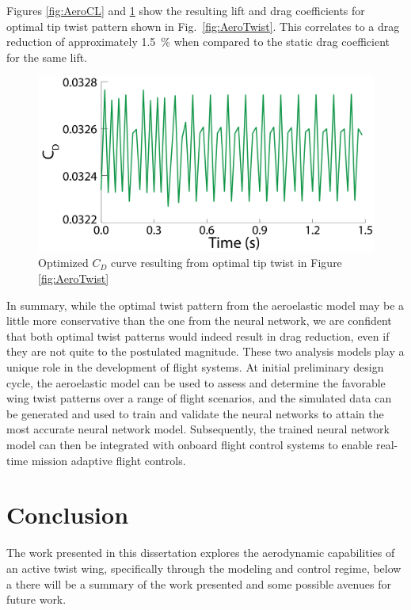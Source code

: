 \documentclass[11pt]{ucthesis}
\begin{document}
Figures \ref{fig:AeroCL} and \ref{fig:AeroCD} show the resulting lift and drag coefficients for optimal tip twist pattern shown in Fig.~\ref{fig:AeroTwist}. This correlates to a drag reduction of approximately 1.5~\% when compared to the static drag coefficient for the same lift.
\begin{figure}[thpb]
\centering
\includegraphics[width=0.9\linewidth]{./Figures/OptimalAeroCD-01.png}
\caption{Optimized $C_D$ curve resulting from optimal tip twist in Figure \ref{fig:AeroTwist}}
\label{fig:AeroCD}
\end{figure}
In summary, while the optimal twist pattern from the aeroelastic model may be a little more conservative than the one from the neural network, we are confident that both optimal twist patterns would indeed result in drag reduction, even if they are not quite to the postulated magnitude. These two analysis models play a unique role in the development of flight systems. At initial preliminary design cycle, the aeroelastic model can be used to assess and determine the favorable wing twist patterns over a range of flight scenarios, and the simulated data can be generated and used to train and validate the neural networks to attain the most accurate neural network model. Subsequently, the trained neural network model can then be integrated with onboard flight control systems to enable real-time mission adaptive flight controls.  

\chapter{Conclusion}
The work presented in this dissertation explores the aerodynamic capabilities of an active twist wing, specifically through the modeling and control regime, below a there will be a summary of the work presented and some possible avenues for future work.
\end{document}
